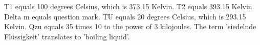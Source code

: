 T1 equals 100 degrees Celsius, which is 373.15 Kelvin.
T2 equals 393.15 Kelvin.
Delta m equals question mark.
TU equals 20 degrees Celsius, which is 293.15 Kelvin.
Qzu equals 35 times 10 to the power of 3 kilojoules.
The term 'siedelnde Flüssigkeit' translates to 'boiling liquid'.